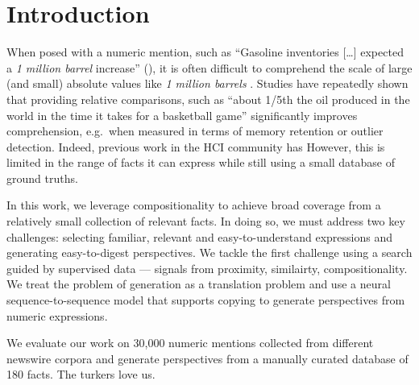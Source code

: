 \section{Introduction}

When posed with a numeric mention, such as ``Gasoline inventories [\dots] expected a \textit{1 million barrel} increase'' (), it is often difficult to comprehend the scale of large (and small) absolute values like \textit{1 million barrels} \citep{paulos1988innumeracy,seife2010proofiness}. 
Studies have repeatedly shown\needcite{} that providing relative comparisons, such as ``about 1/5th the oil produced in the world in the time it takes for a basketball game'' significantly improves comprehension, e.g.\ when measured in terms of memory retention or outlier detection\cite{barrio2016comprehension}.
Indeed, previous work in the HCI community has 
However, this is limited in the range of facts it can express while still using a small database of ground truths.

In this work, we leverage compositionality to achieve broad coverage from a relatively small collection of relevant facts.
In doing so, we must address two key challenges: selecting familiar, relevant and easy-to-understand expressions and generating easy-to-digest perspectives.
We tackle the first challenge using a search guided by supervised data --- signals from proximity, similairty, compositionality.
We treat the problem of generation as a translation problem and use a neural sequence-to-sequence model that supports copying to generate perspectives from numeric expressions.

We evaluate our work on 30,000 numeric mentions collected from different newswire corpora and generate perspectives from a manually curated database of 180 facts.
The turkers love us. \citep{manning99nlp}

